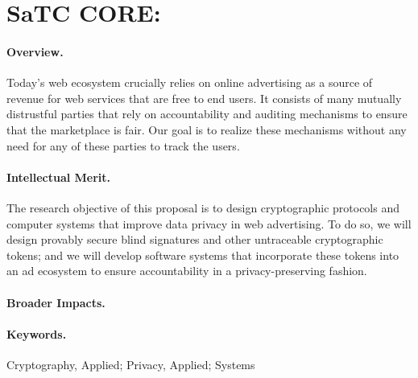 \section*{SaTC CORE: \proptitle{}}
\label{sec:summary}

\paragraph{Overview.}
%
Today’s web ecosystem crucially relies on online advertising as a source of revenue for web services that are free to end users.  It consists of many mutually distrustful parties that rely on accountability and auditing mechanisms to ensure that the marketplace is fair.  Our goal is to realize these mechanisms without any need for any of these parties to track the users. 

\paragraph{Intellectual Merit.}
The research objective of this proposal is to design cryptographic protocols and computer systems that improve data privacy in web advertising.  To do so, we will design provably secure blind signatures and other untraceable cryptographic tokens; and we will develop software systems that incorporate these tokens into an ad ecosystem to ensure accountability in a privacy-preserving fashion.

\paragraph{Broader Impacts.}


\paragraph{Keywords.} Cryptography, Applied; Privacy, Applied; Systems

